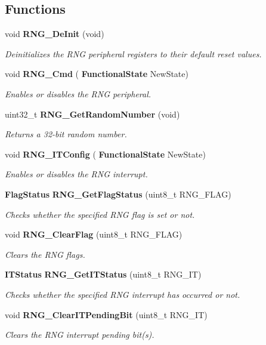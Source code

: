 \subsection*{Functions}
\begin{DoxyCompactItemize}
\item 
void \textbf{ R\+N\+G\+\_\+\+De\+Init} (void)
\begin{DoxyCompactList}\small\item\em Deinitializes the R\+NG peripheral registers to their default reset values. \end{DoxyCompactList}\item 
void \textbf{ R\+N\+G\+\_\+\+Cmd} (\textbf{ Functional\+State} New\+State)
\begin{DoxyCompactList}\small\item\em Enables or disables the R\+NG peripheral. \end{DoxyCompactList}\item 
uint32\+\_\+t \textbf{ R\+N\+G\+\_\+\+Get\+Random\+Number} (void)
\begin{DoxyCompactList}\small\item\em Returns a 32-\/bit random number. \end{DoxyCompactList}\item 
void \textbf{ R\+N\+G\+\_\+\+I\+T\+Config} (\textbf{ Functional\+State} New\+State)
\begin{DoxyCompactList}\small\item\em Enables or disables the R\+NG interrupt. \end{DoxyCompactList}\item 
\textbf{ Flag\+Status} \textbf{ R\+N\+G\+\_\+\+Get\+Flag\+Status} (uint8\+\_\+t R\+N\+G\+\_\+\+F\+L\+AG)
\begin{DoxyCompactList}\small\item\em Checks whether the specified R\+NG flag is set or not. \end{DoxyCompactList}\item 
void \textbf{ R\+N\+G\+\_\+\+Clear\+Flag} (uint8\+\_\+t R\+N\+G\+\_\+\+F\+L\+AG)
\begin{DoxyCompactList}\small\item\em Clears the R\+NG flags. \end{DoxyCompactList}\item 
\textbf{ I\+T\+Status} \textbf{ R\+N\+G\+\_\+\+Get\+I\+T\+Status} (uint8\+\_\+t R\+N\+G\+\_\+\+IT)
\begin{DoxyCompactList}\small\item\em Checks whether the specified R\+NG interrupt has occurred or not. \end{DoxyCompactList}\item 
void \textbf{ R\+N\+G\+\_\+\+Clear\+I\+T\+Pending\+Bit} (uint8\+\_\+t R\+N\+G\+\_\+\+IT)
\begin{DoxyCompactList}\small\item\em Clears the R\+NG interrupt pending bit(s). \end{DoxyCompactList}\end{DoxyCompactItemize}


